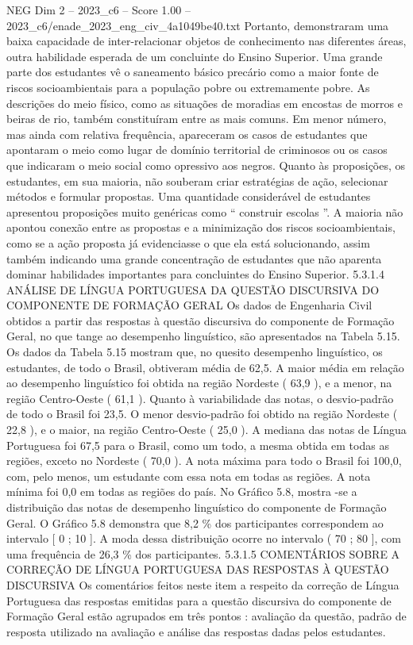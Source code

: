 \begin{textsample}{NEG Dim 2 – 2023\_c6 – Score 1.00 – 2023\_c6/enade\_2023\_eng\_civ\_4a1049be40.txt}
Portanto, demonstraram uma baixa capacidade de inter-relacionar objetos de conhecimento nas diferentes áreas, outra habilidade esperada de um concluinte do Ensino Superior.
Uma grande parte dos estudantes vê o saneamento básico precário como a maior fonte de riscos socioambientais para a população pobre ou extremamente pobre.
As descrições do meio físico, como as situações de moradias em encostas de morros e beiras de rio, também constituíram entre as mais comuns.
Em menor número, mas ainda com relativa frequência, apareceram os casos de estudantes que apontaram o meio como lugar de domínio territorial de criminosos ou os casos que indicaram o meio social como opressivo aos negros.
Quanto às proposições, os estudantes, em sua maioria, não souberam criar estratégias de ação, selecionar métodos e formular propostas.
Uma quantidade considerável de estudantes apresentou proposições muito genéricas como “ construir escolas ”.
A maioria não apontou conexão entre as propostas e a minimização dos riscos socioambientais, como se a ação proposta já evidenciasse o que ela está solucionando, assim também indicando uma grande concentração de estudantes que não aparenta dominar habilidades importantes para concluintes do Ensino Superior. 5.3.1.4 ANÁLISE DE LÍNGUA PORTUGUESA DA QUESTÃO DISCURSIVA DO COMPONENTE DE FORMAÇÃO GERAL Os dados de Engenharia Civil obtidos a partir das respostas à questão discursiva do componente de Formação Geral, no que tange ao desempenho linguístico, são apresentados na Tabela 5.15.
Os dados da Tabela 5.15 mostram que, no quesito desempenho linguístico, os estudantes, de todo o Brasil, obtiveram média de 62,5.
A maior média em relação ao desempenho linguístico foi obtida na região Nordeste ( 63,9 ), e a menor, na região Centro-Oeste ( 61,1 ).
Quanto à variabilidade das notas, o desvio-padrão de todo o Brasil foi 23,5.
O menor desvio-padrão foi obtido na região Nordeste ( 22,8 ), e o maior, na região Centro-Oeste ( 25,0 ).
A mediana das notas de Língua Portuguesa foi 67,5 para o Brasil, como um todo, a mesma obtida em todas as regiões, exceto no Nordeste ( 70,0 ).
A nota máxima para todo o Brasil foi 100,0, com, pelo menos, um estudante com essa nota em todas as regiões.
A nota mínima foi 0,0 em todas as regiões do país.
No Gráfico 5.8, mostra -se a distribuição das notas de desempenho linguístico do componente de Formação Geral.
O Gráfico 5.8 demonstra que 8,2 \% dos participantes correspondem ao intervalo [ 0 ; 10 ].
A moda dessa distribuição ocorre no intervalo ( 70 ; 80 ], com uma frequência de 26,3 \% dos participantes. 5.3.1.5 COMENTÁRIOS SOBRE A CORREÇÃO DE LÍNGUA PORTUGUESA DAS RESPOSTAS À QUESTÃO DISCURSIVA Os comentários feitos neste item a respeito da correção de Língua Portuguesa das respostas emitidas para a questão discursiva do componente de Formação Geral estão agrupados em três pontos : avaliação da questão, padrão de resposta utilizado na avaliação e análise das respostas dadas pelos estudantes.

\end{textsample}
